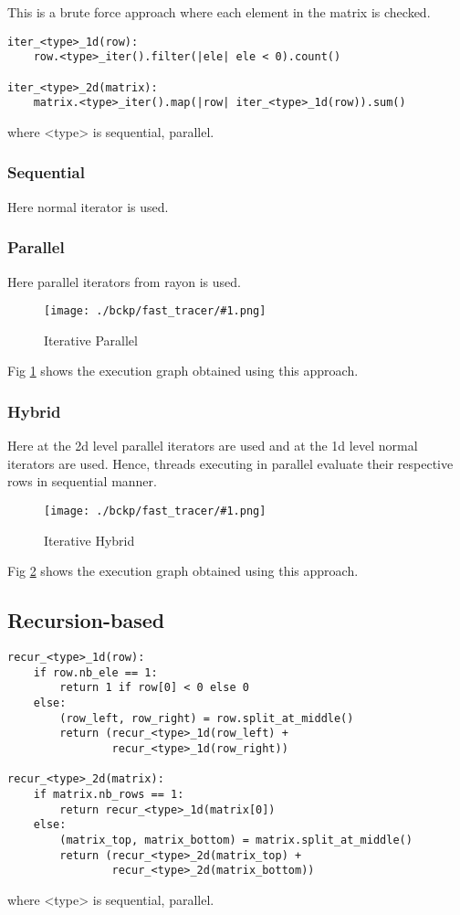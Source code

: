 \documentclass{article}
\newcommand{\loadFig}[2]{{%
\begin{figure}[!ht]
    \texttt{[image: ./bckp/fast\_tracer/\#1.png]}
    \caption{#2}
    \label{#1}
\end{figure}}
}%
\begin{document}
This is a brute force approach where each element in the matrix is checked.

\begin{lstlisting}[caption = Iterative]
iter_<type>_1d(row):
    row.<type>_iter().filter(|ele| ele < 0).count()

iter_<type>_2d(matrix):
    matrix.<type>_iter().map(|row| iter_<type>_1d(row)).sum()
\end{lstlisting}
where <type> is sequential, parallel.

\subsubsection{Sequential}
Here normal iterator is used.

\subsubsection{Parallel}
Here parallel iterators from rayon is used.

\loadFig{iter_par_2d}{Iterative Parallel}

Fig \ref{iter_par_2d} shows the execution graph\cite{fast_tracer} obtained using this approach.


\subsubsection{Hybrid}
Here at the 2d level parallel iterators are used and at the 1d level normal iterators are used.
Hence, threads executing in parallel evaluate their respective rows in sequential manner.

\loadFig{iter_hyb_2d}{Iterative Hybrid}

Fig \ref{iter_hyb_2d} shows the execution graph obtained using this approach.

\subsection{Recursion-based}
\begin{lstlisting}[caption = Recursive]
recur_<type>_1d(row):
    if row.nb_ele == 1:
        return 1 if row[0] < 0 else 0
    else:
        (row_left, row_right) = row.split_at_middle()
        return (recur_<type>_1d(row_left) + 
                recur_<type>_1d(row_right))

recur_<type>_2d(matrix):
    if matrix.nb_rows == 1:
        return recur_<type>_1d(matrix[0])
    else:
        (matrix_top, matrix_bottom) = matrix.split_at_middle()
        return (recur_<type>_2d(matrix_top) + 
                recur_<type>_2d(matrix_bottom))
\end{lstlisting}
where <type> is sequential, parallel.
\end{document}
